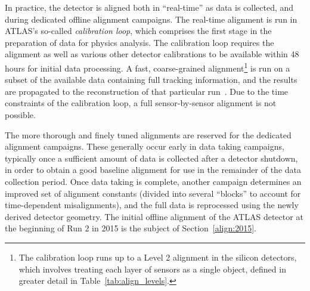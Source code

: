 In practice, the detector is aligned both in ``real-time'' as data is collected, and during dedicated offline alignment campaigns.
The real-time alignment is run in ATLAS's so-called \emph{calibration loop}, which comprises the first stage in the preparation of data for physics analysis.
The calibration loop requires the alignment as well as various other detector calibrations to be available within 48 hours for initial data processing.
A fast, coarse-grained alignment\footnote{The calibration loop runs up to a Level 2 alignment in the silicon detectors, which involves treating each layer of sensors as a single object, defined in greater detail in Table~\ref{tab:align_levels}.} is run on a subset of the available data containing full tracking information, and the results are propagated to the reconstruction of that particular run~\cite{2015.alignment-run-2-proceedings}.
Due to the time constraints of the calibration loop, a full sensor-by-sensor alignment is not possible.

The more thorough and finely tuned alignments are reserved for the dedicated alignment campaigns.
These generally occur early in data taking campaigns, typically once a sufficient amount of data is collected after a detector shutdown, in order to obtain a good baseline alignment for use in the remainder of the data collection period.
Once data taking is complete, another campaign determines an improved set of alignment constants (divided into several ``blocks'' to account for time-dependent misalignments), and the full data is reprocessed using the newly derived detector geometry.
The initial offline alignment of the ATLAS detector at the beginning of Run 2 in 2015 is the subject of Section~\ref{align:2015}.

